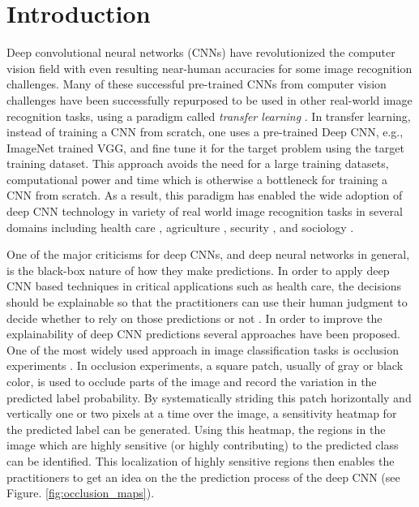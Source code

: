 \section{Introduction}
Deep convolutional neural networks (CNNs) \cite{alexnet, vggnet} have revolutionized the computer vision field with even resulting near-human accuracies for some image recognition challenges.
Many of these successful pre-trained CNNs from computer vision challenges have been successfully repurposed to be used in other real-world image recognition tasks, using a paradigm called \textit{transfer learning} \cite{transfer-learning-factors}.
In transfer learning, instead of training a CNN from scratch, one uses a pre-trained Deep CNN, e.g., ImageNet trained VGG, and fine tune it for the target problem using the target training dataset.
This approach avoids the need for a large training datasets, computational power and time which is otherwise a bottleneck for training a CNN from scratch.
As a result, this paradigm has enabled the wide adoption of deep CNN technology in variety of real world image recognition tasks in several domains including health care \cite{kermany2018identifying, islam2017abnormality}, agriculture \cite{mohanty2016using}, security \cite{arbabzadah2016identifying}, and sociology \cite{wang2017deep}.


One of the major criticisms for deep CNNs, and deep neural networks in general, is the black-box nature of how they make predictions.
In order to apply deep CNN based techniques in critical applications such as health care, the decisions should be explainable so that the practitioners can use their human judgment to decide whether to rely on those predictions or not \cite{jung2017deep}.
In order to improve the explainability of deep CNN predictions several approaches have been proposed.
One of the most widely used approach in image classification tasks is occlusion experiments \cite{zeiler2014visualizing}.
In occlusion experiments, a square patch, usually of gray or black color, is used to occlude parts of the image and record the variation in the predicted label probability.
By systematically striding this patch horizontally and vertically one or two pixels at a time over the image, a sensitivity heatmap for the predicted label can be generated.
Using this heatmap, the regions in the image which are highly sensitive (or highly contributing) to the predicted class can be identified.
This localization of highly sensitive regions then enables the practitioners to get an idea on the the prediction process of the deep CNN (see Figure. \ref{fig:occlusion_maps}).

